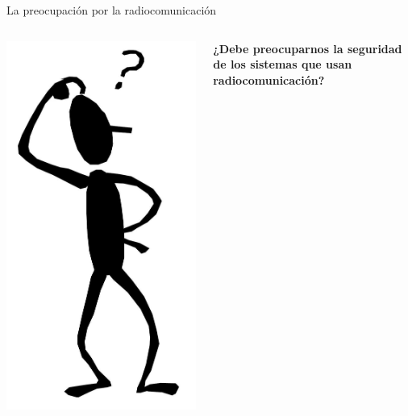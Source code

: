 \documentclass{beamer}
\begin{document}
\begin{frame}{La preocupación por la radiocomunicación}

\begin{columns}

\begin{column}{.25\textwidth}
\begin{center}
\includegraphics[scale=0.1]{Question-Mark.jpg}
\end{center}
\end{column}

\begin{column}{.66\textwidth}
\bigskip
\textbf{¿Debe preocuparnos la seguridad de los sistemas que usan radiocomunicación?}
\end{column}

\end{columns}

\end{frame}
\end{document}
